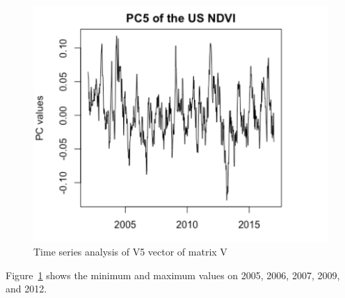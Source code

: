     \begin{figure}[H]
            \centering
            \includegraphics[width=0.70\linewidth]{figures/ch5/SVD/pc5.png}
            \caption{\label{fig:V_5} Time series analysis of V5 vector of matrix V}
    \end{figure}
    
    Figure~\ref{fig:V_5} shows the minimum and maximum values on 2005, 2006, 2007, 2009, and 2012.